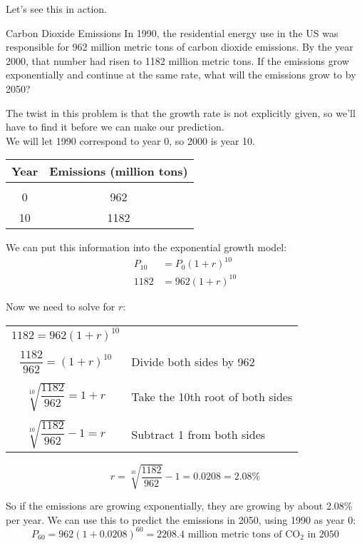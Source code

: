 Let's see this in action.

\begin{example}[https://www.youtube.com/watch?v=2wtJ_T3_e7o&list=PLfmpjsIzhztutjEb8Pg5OBOlI1p80yVoy&index=10]{Carbon Dioxide Emissions}
In 1990, the residential energy use in the US was responsible for 962 million metric tons of carbon dioxide emissions.  By the year 2000, that number had risen to 1182 million metric tons.  If the emissions grow exponentially and continue at the same rate, what will the emissions grow to by 2050?

\solline
{}
The twist in this problem is that the growth rate is not explicitly given, so we'll have to find it before we can make our prediction.\\

We will let 1990 correspond to year 0, so 2000 is year 10.
\begin{center}
\begin{tabular}{c c}
\textbf{Year} & \textbf{Emissions (million tons)}\\
\hline
& \\
0 & 962\\
10 & 1182
\end{tabular}
\end{center}
We can put this information into the exponential growth model:
\begin{align*}
P_{10} &= P_0(1+r)^{10}\\
1182 &= 962(1+r)^{10}
\end{align*}

Now we need to solve for $r$:
\begin{center}
\begin{tabular}{c l}
$1182 = 962(1+r)^{10}$ & \\
& \\
$\dfrac{1182}{962} = (1+r)^{10}$ & Divide both sides by 962\\
& \\
$\sqrt[10]{\dfrac{1182}{962}} = 1+r$ & Take the 10th root of both sides\\
& \\
$\sqrt[10]{\dfrac{1182}{962}}-1 = r$ & Subtract 1 from both sides
\end{tabular}
\end{center}
\[r=\sqrt[10]{\dfrac{1182}{962}}-1 = 0.0208 = 2.08\%\]

So if the emissions are growing exponentially, they are growing by about 2.08\% per year.  We can use this to predict the emissions in 2050, using 1990 as year 0:
\[P_{60} = 962(1+0.0208)^{60} = \boxed{2208.4 \textrm{ million metric tons of CO}_2 \textrm{ in 2050}}\]
\end{example}


